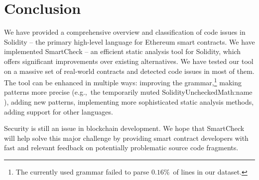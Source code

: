 \section{Conclusion}
	
We have provided a comprehensive overview and classification of code issues in Solidity -- the primary high-level language for Ethereum smart contracts.
We have implemented SmartCheck -- an efficient static analysis tool for Solidity, which offers significant improvements over existing alternatives.
We have tested our tool on a massive set of real-world contracts and detected code issues in most of them.
The tool can be enhanced in multiple ways: improving the grammar,\footnote{The currently used grammar failed to parse $0.16\%$~of lines in our dataset.} making patterns more precise (e.g.,~the temporarily muted {\usevalue SolidityUncheckedMath:name }), adding new patterns, implementing more sophisticated static analysis methods, adding support for other languages.

Security is still an issue in blockchain development.
We hope that SmartCheck will help solve this major challenge by providing smart contract developers with fast and relevant feedback on potentially problematic source code fragments.
